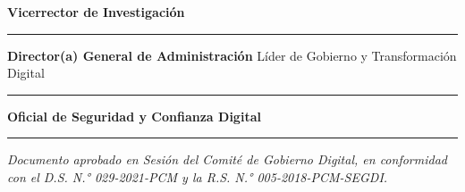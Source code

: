 \documentclass[10pt,letterpaper]{article}
\begin{document}
\textbf{Vicerrector de Investigación}

\begin{center}\rule{0.5\linewidth}{0.5pt}\end{center}

\textbf{Director(a) General de Administración} Líder de Gobierno y
Transformación Digital

\begin{center}\rule{0.5\linewidth}{0.5pt}\end{center}

\textbf{Oficial de Seguridad y Confianza Digital}

\begin{center}\rule{0.5\linewidth}{0.5pt}\end{center}

\emph{Documento aprobado en Sesión del Comité de Gobierno Digital, en
conformidad con el D.S. N.° 029-2021-PCM y la R.S. N.°
005-2018-PCM-SEGDI.}
\end{document}
